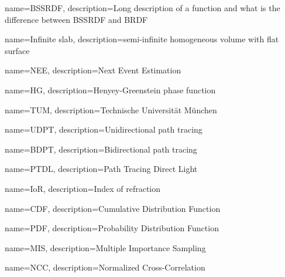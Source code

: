 {
    name={BSSRDF},
    description={Long description of a function and what is the difference
    between BSSRDF and BRDF}
}

{
    name={Infinite slab},
    description={semi-infinite homogeneous volume with flat surface}
}

{
    name={NEE},
    description={Next Event Estimation}
}

{
    name={HG},
    description={Henyey-Greenstein phase function}
}

{
    name={TUM},
    description={Technische Universität München}
}

{
    name={UDPT},
    description={Unidirectional path tracing}
}

{
    name={BDPT},
    description={Bidirectional path tracing}
}

{
    name={PTDL},
    description={Path Tracing Direct Light}
}

{
    name={IoR},
    description={Index of refraction}
}

{
    name={CDF},
    description={Cumulative Distribution Function}
}

{
    name={PDF},
    description={Probability Distribution Function}
}

{
    name={MIS},
    description={Multiple Importance Sampling}
}

{
    name={NCC},
    description={Normalized Cross-Correlation}
}
